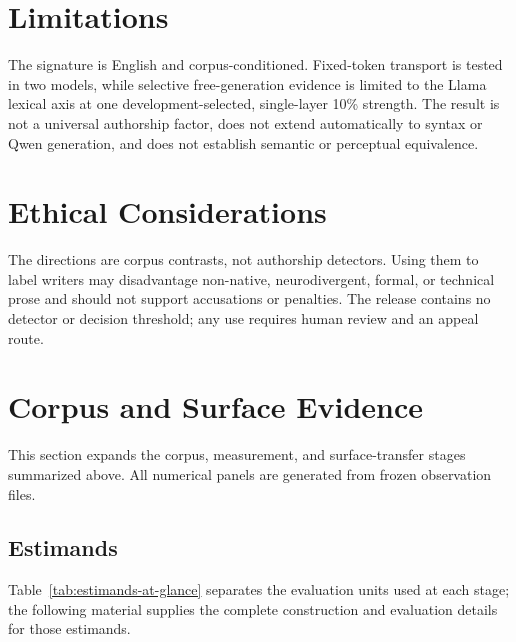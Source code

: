 \section{Limitations}

The signature is English and corpus-conditioned. Fixed-token transport is tested in two models, while selective free-generation evidence is limited to the Llama lexical axis at one development-selected, single-layer 10\% strength. The result is not a universal authorship factor, does not extend automatically to syntax or Qwen generation, and does not establish semantic or perceptual equivalence.

\section{Ethical Considerations}

The directions are corpus contrasts, not authorship detectors. Using them to label writers may disadvantage non-native, neurodivergent, formal, or technical prose and should not support accusations or penalties. The release contains no detector or decision threshold; any use requires human review and an appeal route.

\section{Corpus and Surface Evidence}
\label{app:moved-overview}
\label{app:method-detail}

This section expands the corpus, measurement, and surface-transfer stages summarized above. All numerical panels are generated from frozen observation files.

\subsection{Estimands}

Table~\ref{tab:estimands-at-glance} separates the evaluation units used at each stage; the following material supplies the complete construction and evaluation details for those estimands.

